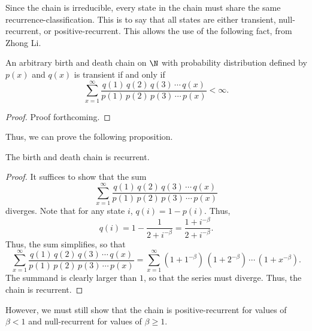 Since the chain is irreducible, every state in the chain must share the same recurrence-classification.
This is to say that all states are either transient, null-recurrent, or positive-recurrent. This allows
the use of the following fact, from Zhong Li.
\begin{proposition}
    An arbitrary birth and death chain on $\N$ with probability distribution defined by $p(x)$ and
    $q(x)$ is transient if and only if
    \[
        \sum_{x = 1}^{\infty} \frac{q(1)\,q(2)\,q(3)\,\cdots\,q(x)}{p(1)\,p(2)\,p(3)\,\cdots\,p(x)} <
        \infty.  
    \]
\end{proposition}
\begin{proof}
    Proof forthcoming.
\end{proof}

Thus, we can prove the following proposition.
\begin{proposition}
    The birth and death chain is recurrent.
\end{proposition}
\begin{proof}
    It suffices to show that the sum
    \[
        \sum_{x = 1}^{\infty} \frac{q(1)\,q(2)\,q(3)\,\cdots\,q(x)}{p(1)\,p(2)\,p(3)\,\cdots\,p(x)}
    \]
    diverges. Note that for any state $i$, $q(i) = 1-p(i)$. Thus,
    \[
        q(i) = 1 - \frac{1}{2 + i^{-\beta}} = \frac{1 + i^{-\beta}}{2 + i^{-\beta}}.  
    \]
    Thus, the sum simplifies, so that
    \[
        \sum_{x = 1}^{\infty} \frac{q(1)\,q(2)\,q(3)\,\cdots\,q(x)}{p(1)\,p(2)\,p(3)\,\cdots\,p(x)} =
        \sum_{x = 1}^{\infty} (1+1^{-\beta})\,(1+2^{-\beta})\,\cdots\,(1 + x^{-\beta}).
    \]
    The summand is clearly larger than $1$, so that the series must diverge. Thus, the chain is
    recurrent.
\end{proof}

However, we must still show that the chain is positive-recurrent for values of $\beta < 1$ and
null-recurrent for values of $\beta \geq 1$.


